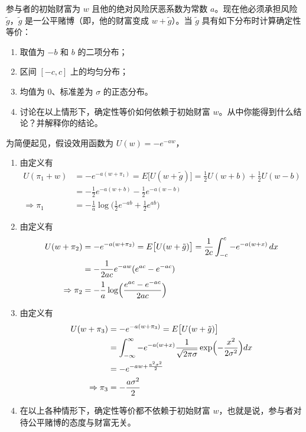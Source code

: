 \begin{problem}
 参与者的初始财富为 $w$ 且他的绝对风险厌恶系数为常数 $a$。现在他必须承担风险 $\tilde{g}$，$\tilde{g}$ 是一公平赌博（即，他的财富变成 $w+\tilde{g}$）。当 $\tilde{g}$ 具有如下分布时计算确定性等价：
\begin{enumerate}[label=(\alph*)]
    \item 取值为 $-b$ 和 $b$ 的二项分布；
    \item 区间 $[-c,c]$ 上的均匀分布；
    \item 均值为 0、标准差为 $\sigma$ 的正态分布。
    \item 讨论在以上情形下，确定性等价如何依赖于初始财富 $w$。从中你能得到什么结论？并解释你的结论。
\end{enumerate}
\end{problem}
\begin{solution}
为简便起见，假设效用函数为 $U(w)=-e^{-aw}$，
\begin{enumerate}[label=(\alph*)]
    \item 由定义有
    \[
        \begin{aligned}
            U(\pi_{1}+w)
            &=-e^{-a(w+\pi_{1})}=E\bigl[U(w+\tilde{g})\bigr]=\tfrac12 U(w+b)+\tfrac12 U(w-b)\\
            &=-\tfrac12 e^{-a(w+b)}-\tfrac12 e^{-a(w-b)}\\
            \Rightarrow\pi_{1}&=-\frac{1}{a}\log\bigl(\tfrac12 e^{-ab}+\tfrac12 e^{ab}\bigr)
        \end{aligned}
    \]

    \item 由定义有
    \[
        \begin{aligned}
            U(w+\pi_{2})
            &=-e^{-a(w+\pi_{2})}=E\bigl[U(w+\tilde{g})\bigr]=\frac{1}{2c}\int_{-c}^{c}-e^{-a(w+x)}\,dx\\
            &=-\frac{1}{2ac}e^{-aw}(e^{ac}-e^{-ac})\\
            \Rightarrow\pi_{2}&=-\frac{1}{a}\log\Bigl(\frac{e^{ac}-e^{-ac}}{2ac}\Bigr)
        \end{aligned}
    \]

    \item 由定义有
    \[
        \begin{aligned}
            U(w+\pi_{3})
            &=-e^{-a(w+\pi_{3})}=E\bigl[U(w+\tilde{g})\bigr]\\
            &=\int_{-\infty}^{\infty}-e^{-a(w+x)}\frac{1}{\sqrt{2\pi\sigma}}\exp\Bigl(-\frac{x^{2}}{2\sigma^{2}}\Bigr)dx\\
            &=-e^{-aw+\frac{a^{2}\sigma^{2}}{2}}\\
            \Rightarrow\pi_{3}&=-\frac{a\sigma^{2}}{2}
        \end{aligned}
    \]

    \item 在以上各种情形下，确定性等价都不依赖于初始财富 $w$，也就是说，参与者对待公平赌博的态度与财富无关。
\end{enumerate}
\end{solution}

